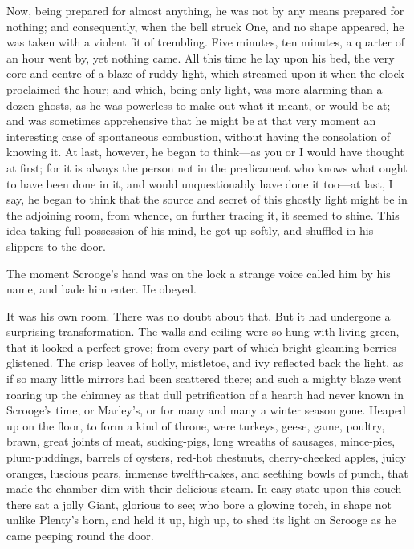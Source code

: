 \documentclass[paper=5.5in:8.5in,BCOR=15mm,twoside,DIV=15,headinclude=off,12pt,chapterprefix=off,openany,headings=huge]{scrbook} %
\begin{document}
Now, being prepared for almost anything, he was not by any means prepared for nothing; and consequently, when the bell struck One, and no shape appeared, he was taken with a violent fit of trembling. Five minutes, ten minutes, a quarter of an hour went by, yet nothing came. All this time he lay upon his bed, the very core and centre of a blaze of ruddy light, which streamed upon it when the clock proclaimed the hour; and which, being only light, was more alarming than a dozen ghosts, as he was powerless to make out what it meant, or would be at; and was sometimes apprehensive that he might be at that very moment an interesting case of spontaneous combustion, without having the consolation of knowing it. At last, however, he began to think—as you or I would have thought at first; for it is always the person not in the predicament who knows what ought to have been done in it, and would unquestionably have done it too—at last, I say, he began to think that the source and secret of this ghostly light might be in the adjoining room, from whence, on further tracing it, it seemed to shine. This idea taking full possession of his mind, he got up softly, and shuffled in his slippers to the door.

The moment Scrooge's hand was on the lock a strange voice called him by his name, and bade him enter. He obeyed.

It was his own room. There was no doubt about that. But it had undergone a surprising transformation. The walls and ceiling were so hung with living green, that it looked a perfect grove; from every part of which bright gleaming berries glistened. The crisp leaves of holly, mistletoe, and ivy reflected back the light, as if so many little mirrors had been scattered there; and such a mighty blaze went roaring up the chimney as that dull petrification of a hearth had never known in Scrooge's time, or Marley's, or for many and many a winter season gone. Heaped up on the floor, to form a kind of throne, were turkeys, geese, game, poultry, brawn, great joints of meat, sucking-pigs, long wreaths of sausages, mince-pies, plum-puddings, barrels of oysters, red-hot chestnuts, cherry-cheeked apples, juicy oranges, luscious pears, immense twelfth-cakes, and seething bowls of punch, that made the chamber dim with their delicious steam. In easy state upon this couch there sat a jolly Giant, glorious to see; who bore a glowing torch, in shape not unlike Plenty's horn, and held it up, high up, to shed its light on Scrooge as he came peeping round the door.
\end{document}
